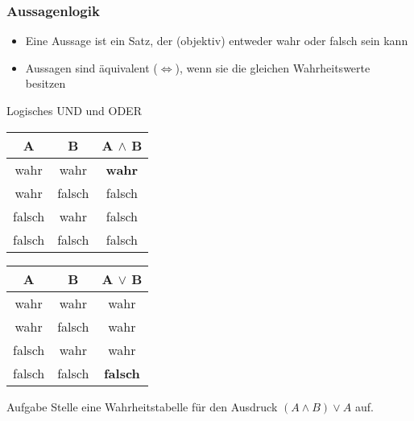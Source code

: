 \documentclass{beamer}
\begin{document}
\begin {frame} 
	\frametitle {Aussagenlogik}
	\begin{block}{}
		\begin{itemize}
			\item Eine Aussage ist ein Satz, der (objektiv) entweder wahr oder falsch sein kann
			\item Aussagen sind äquivalent (\(\Leftrightarrow\)), wenn sie die gleichen Wahrheitswerte besitzen
		\end{itemize}
	\end{block}
	\pause
	\begin{block}{Logisches UND und ODER}
	\begin{center}
		\begin{tabular}{|c|c||c| }
			\hline
			A 		&  B 		& A $\land$ B	\\
			\hline
			wahr 		& wahr 	& \textbf{wahr}	\\
			\hline
			wahr 		& falsch 	& falsch	\\
			\hline
			falsch 		& wahr 	& falsch	\\
			\hline
			falsch 		& falsch 	& falsch	\\
			\hline
		\end{tabular}
		\begin{tabular}{|c|c||c| }
			\hline
			A 		&  B 		& A $\lor$ B	\\
			\hline
			wahr 		& wahr 	& wahr	\\
			\hline
			wahr 		& falsch 	& wahr	\\
			\hline
			falsch 		& wahr 	& wahr	\\
			\hline
			falsch 		& falsch 	& \textbf{falsch}	\\
			\hline
		\end{tabular}
	\end{center}
	\end{block}
	\pause	
	\begin{exampleblock}{Aufgabe}
		Stelle eine Wahrheitstabelle für den Ausdruck \((A\wedge B)\vee A\) auf.
	\end{exampleblock}
\end{frame}
\end{document}
